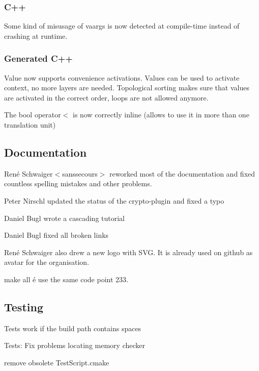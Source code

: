 \subsubsection*{C++}

Some kind of misusage of vaargs is now detected at compile-\/time instead of crashing at runtime.

\subsubsection*{Generated C++}

Value now supports convenience activations. Values can be used to activate context, no more layers are needed. Topological sorting makes sure that values are activated in the correct order, loops are not allowed anymore.

The {\ttfamily bool operator$<$} is now correctly inline (allows to use it in more than one translation unit)

\subsection*{Documentation}

René Schwaiger$<$sanssecours$>$ reworked most of the documentation and fixed countless spelling mistakes and other problems.


\begin{DoxyItemize}
\item Peter Nirschl updated the status of the crypto-\/plugin and fixed a typo
\item Daniel Bugl wrote a cascading tutorial
\item Daniel Bugl fixed all broken links
\item René Schwaiger also drew a new logo with S\+VG. It is already used on github as avatar for the organisation.
\item make all é use the same code point 233.
\end{DoxyItemize}

\subsection*{Testing}


\begin{DoxyItemize}
\item Tests work if the build path contains spaces
\item Tests\+: Fix problems locating memory checker
\item remove obsolete Test\+Script.\+cmake
\end{DoxyItemize}

